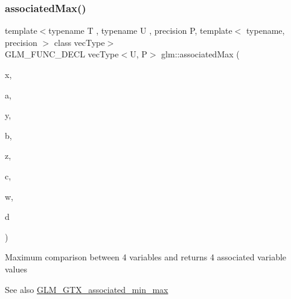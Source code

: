 \subsubsection{\texorpdfstring{associated\+Max()}{associatedMax()}\hspace{0.1cm}{\footnotesize\ttfamily [11/12]}}
{\footnotesize\ttfamily template$<$typename T , typename U , precision P, template$<$ typename, precision $>$ class vec\+Type$>$ \\
G\+L\+M\+\_\+\+F\+U\+N\+C\+\_\+\+D\+E\+CL vec\+Type$<$U, P$>$ glm\+::associated\+Max (\begin{DoxyParamCaption}\item[{T}]{x,  }\item[{vec\+Type$<$ U, P $>$ const \&}]{a,  }\item[{T}]{y,  }\item[{vec\+Type$<$ U, P $>$ const \&}]{b,  }\item[{T}]{z,  }\item[{vec\+Type$<$ U, P $>$ const \&}]{c,  }\item[{T}]{w,  }\item[{vec\+Type$<$ U, P $>$ const \&}]{d }\end{DoxyParamCaption})}

Maximum comparison between 4 variables and returns 4 associated variable values \begin{DoxySeeAlso}{See also}
\hyperlink{group__gtx__associated__min__max}{G\+L\+M\+\_\+\+G\+T\+X\+\_\+associated\+\_\+min\+\_\+max} 
\end{DoxySeeAlso}
\mbox{\label{group__gtx__associated__min__max_ga3122fbe8133ea54749b10fb93e8a167e}} 

